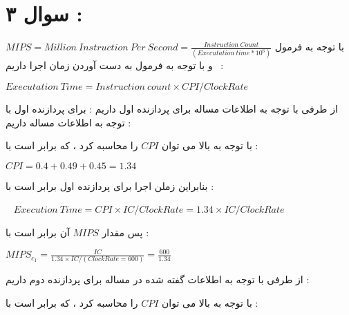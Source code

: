 \documentclass{article}
\begin{document}
\section*{سوال ۳ : }
با توجه  به فرمول 
$MIPS = Million \ Inst
ruction \ Per \ Second = \frac{Instruction \  Count}{(Executation  \ time * 10 ^6)}$
 و با توجه به فرمول به دست آوردن زمان اجرا داریم  : 
\begin{center}
	$ Executation  \ Time  = Instruction \ count \times CPI / Clock Rate $
\end{center}
از طرفی با توجه به اطلاعات مساله  برای پردازنده اول داریم  :
برای پردازنده اول با توجه به اطلاعات مساله داریم  : 
\begin{center}
	\begin{table}[h]
		\centering
	\end{table}
\end{center}
با توجه به بالا می توان 
$CPI$
را محاسبه کرد ، که برابر است با   : 

\begin{center}
 $ CPI = 0.4 + 0.49 + 0.45 = 1.34$
\end{center}
بنابراین زملن اجرا برای پردازنده اول برابر است با   : 
 \begin{center}
  $ Execution \ Time  = CPI \times IC / Clock Rate =1.34  \times IC  / Clock Rate $
 \end{center}
پس مقدار $MIPS$  آن برابر است با  : 
\begin{center}
	$MIPS_{c_1} = \frac{IC}{1.34  \times IC  / (Clock Rate = 600)} = \frac{600}{1.34} $
\end{center}
از طرفی با توجه به اطلاعات گفته شده در مساله برای پردازنده دوم داریم  : 
\begin{center}
	\begin{table}[h]
		\centering
	\end{table}
\end{center}
با توجه به بالا می توان 
$CPI$
را محاسبه کرد ، که برابر است با   : 
\end{document}
